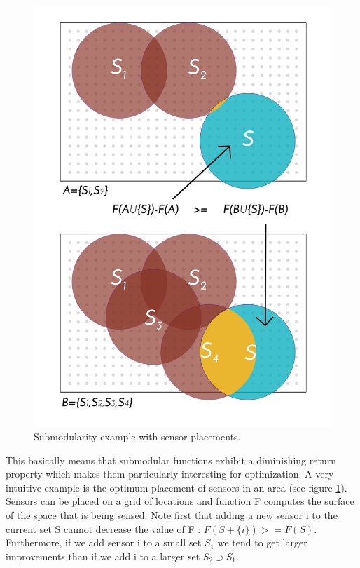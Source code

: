 \documentclass[conference]{IEEEtran}
\begin{document}
\begin{figure}
	\label{fig:submodular}
	\begin{center}
	\includegraphics[scale=.25]{./figure_1/figure_1}
	\caption{Submodularity example with sensor placements.}
	\end{center}
\end{figure}

This basically means that submodular functions exhibit a diminishing return property which makes them particularly interesting for optimization. A very intuitive example is the optimum placement of sensors in an area (see figure \ref{fig:submodular}). Sensors can be placed on a grid of locations and function F computes the surface of the space that is being sensed. Note first that adding a new sensor i to the current set S cannot decrease the value of F : $F(S+\{i\})>=F(S)$. Furthermore, if we add sensor i to a small set $S_1$ we tend to get larger improvements than if we add i to a larger set $S_2 \supset S_1$.
\end{document}
